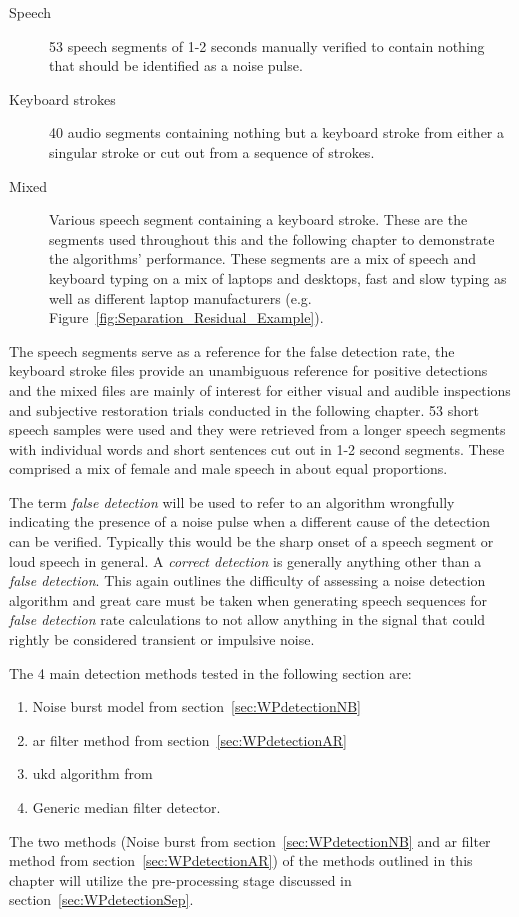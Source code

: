 \begin{description}
  \item[Speech] 53 speech segments of 1-2 seconds manually verified to contain nothing that should be identified as a noise pulse.
  \item[Keyboard strokes] 40 audio segments containing nothing but a keyboard stroke from either a singular stroke or cut out from a sequence of strokes.
  \item[Mixed] Various speech segment containing a keyboard stroke. These are the segments used throughout this and the following chapter to demonstrate the algorithms' performance. These segments are a mix of speech and keyboard typing on a mix of laptops and desktops, fast and slow typing as well as different laptop manufacturers (e.g. Figure~\ref{fig:Separation_Residual_Example}).
\end{description}

The speech segments serve as a reference for the false detection rate, the keyboard stroke files provide an unambiguous reference for positive detections and the mixed files are mainly of interest for either visual and audible inspections and subjective restoration trials conducted in the following chapter. 53 short speech samples were used and they were retrieved from a longer speech segments with individual words and short sentences cut out in 1-2 second segments. These comprised a mix of female and male speech in about equal proportions.

The term \emph{false detection} will be used to refer to an algorithm wrongfully indicating the presence of a noise pulse when a different cause of the detection can be verified. Typically this would be the sharp onset of a speech segment or loud speech in general. A \emph{correct detection} is generally anything other than a \emph{false detection}. This again outlines the difficulty of assessing a noise detection algorithm and great care must be taken when generating speech sequences for \emph{false detection} rate calculations to not allow anything in the signal that could rightly be considered transient or impulsive noise.

The 4 main detection methods tested in the following section are:
\begin{enumerate}
  \item Noise burst model from section~\ref{sec:WPdetectionNB}
  \item \gls{ar} filter method from section~\ref{sec:WPdetectionAR}
  \item \gls{ukd} algorithm from \cite{Subramanya2007}
  \item Generic median filter detector.
\end{enumerate}
The two methods (Noise burst from section~\ref{sec:WPdetectionNB} and \gls{ar} filter method from section~\ref{sec:WPdetectionAR}) of the methods outlined in this chapter will utilize the pre-processing stage discussed in section~\ref{sec:WPdetectionSep}.

